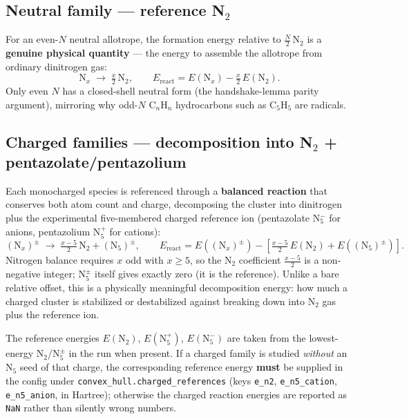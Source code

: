 \documentclass[11pt,a4paper]{article}
\begin{document}
\subsection{Neutral family --- reference N$_2$}

For an even-$N$ neutral allotrope, the formation energy relative to
$\tfrac{N}{2}\,$N$_2$ is a \textbf{genuine physical quantity} --- the energy
to assemble the allotrope from ordinary dinitrogen gas:
\[
  \mathrm{N}_x \;\longrightarrow\; \tfrac{x}{2}\,\mathrm{N}_2,
  \qquad
  E_\text{react} = E(\mathrm{N}_x) - \tfrac{x}{2}\,E(\mathrm{N}_2).
\]
Only even $N$ has a closed-shell neutral form (the handshake-lemma parity
argument), mirroring why odd-$N$ C$_n$H$_n$ hydrocarbons such as C$_5$H$_5$
are radicals.

\subsection{Charged families --- decomposition into N$_2$ + pentazolate/pentazolium}

Each monocharged species is referenced through a \textbf{balanced reaction}
that conserves both atom count and charge, decomposing the cluster into
dinitrogen plus the experimental five-membered charged reference ion
(pentazolate N$_5^{-}$ for anions, pentazolium N$_5^{+}$ for cations):
\[
  (\mathrm{N}_x)^{\pm} \;\longrightarrow\;
    \tfrac{x-5}{2}\,\mathrm{N}_2 + (\mathrm{N}_5)^{\pm},
  \qquad
  E_\text{react} = E\!\left((\mathrm{N}_x)^{\pm}\right)
    - \left[\tfrac{x-5}{2}\,E(\mathrm{N}_2) + E\!\left((\mathrm{N}_5)^{\pm}\right)\right].
\]
Nitrogen balance requires $x$ odd with $x \ge 5$, so the N$_2$ coefficient
$\tfrac{x-5}{2}$ is a non-negative integer; N$_5^{\pm}$ itself gives exactly
zero (it is the reference). Unlike a bare relative offset, this is a
physically meaningful decomposition energy: how much a charged cluster is
stabilized or destabilized against breaking down into N$_2$ gas plus the
reference ion.

\begin{remark}
The reference energies $E(\mathrm{N}_2)$, $E(\mathrm{N}_5^{+})$,
$E(\mathrm{N}_5^{-})$ are taken from the lowest-energy N$_2$/N$_5^{\pm}$ in
the run when present. If a charged family is studied \emph{without} an
N$_5$ seed of that charge, the corresponding reference energy \textbf{must}
be supplied in the config under \texttt{convex\_hull.charged\_references}
(keys \texttt{e\_n2}, \texttt{e\_n5\_cation}, \texttt{e\_n5\_anion}, in
Hartree); otherwise the charged reaction energies are reported as \texttt{NaN}
rather than silently wrong numbers.
\end{remark}
\end{document}
